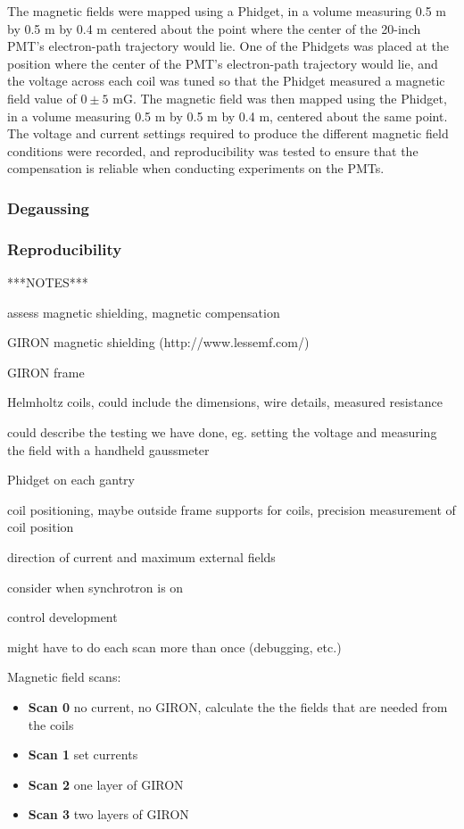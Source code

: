 The magnetic fields were mapped using a Phidget, in a volume measuring 0.5 m by 0.5 m by 0.4 m centered about the point where the center of the 20-inch PMT's electron-path trajectory would lie. 
One of the Phidgets was placed at the position where the center of the PMT's electron-path trajectory would lie, and the voltage across each coil was tuned so that the Phidget measured a magnetic field value of $0\pm5$ mG. The magnetic field was then mapped using the Phidget, in a volume measuring 0.5 m by 0.5 m by 0.4 m, centered about the same point.
The voltage and current settings required to produce the different magnetic field conditions were recorded, and reproducibility was tested to ensure that the compensation is reliable when conducting experiments on the PMTs.

\subsubsection{Degaussing}


\subsubsection{Reproducibility}




***NOTES***

assess magnetic shielding, magnetic compensation

GIRON magnetic shielding (http://www.lessemf.com/)

GIRON frame

Helmholtz coils, could include the dimensions, wire details,
measured resistance

could describe the testing we have done, eg. setting the voltage and
measuring the field with a handheld gaussmeter

Phidget on each gantry


coil positioning, maybe outside frame supports for coils, precision measurement of coil position

direction of current and maximum external fields

consider when synchrotron is on

control development

might have to do each scan more than once (debugging, etc.)

Magnetic field scans:
\begin{itemize}
\item{\bf Scan 0} no current, no GIRON, calculate the the fields that are needed from the coils
\item{\bf Scan 1} set currents
\item{\bf Scan 2} one layer of GIRON
\item{\bf Scan 3} two layers of GIRON
\end{itemize}


